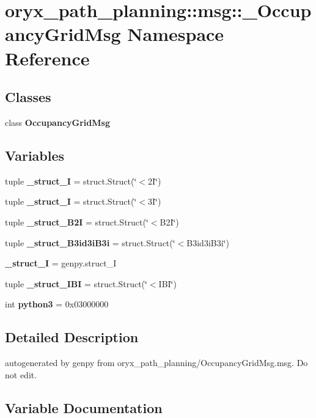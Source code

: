 \section{oryx\-\_\-path\-\_\-planning\-:\-:msg\-:\-:\-\_\-\-Occupancy\-Grid\-Msg \-Namespace \-Reference}
\label{namespaceoryx__path__planning_1_1msg_1_1__OccupancyGridMsg}
\subsection*{\-Classes}
\begin{DoxyCompactItemize}
\item 
class {\bf \-Occupancy\-Grid\-Msg}
\end{DoxyCompactItemize}
\subsection*{\-Variables}
\begin{DoxyCompactItemize}
\item 
tuple {\bf \-\_\-struct\-\_\-I} = struct.\-Struct(\char`\"{}$<$2\-I\char`\"{})
\item 
tuple {\bf \-\_\-struct\-\_\-I} = struct.\-Struct(\char`\"{}$<$3\-I\char`\"{})
\item 
tuple {\bf \-\_\-struct\-\_\-\-B2\-I} = struct.\-Struct(\char`\"{}$<$\-B2\-I\char`\"{})
\item 
tuple {\bf \-\_\-struct\-\_\-\-B3id3i\-B3i} = struct.\-Struct(\char`\"{}$<$\-B3id3i\-B3i\char`\"{})
\item 
{\bf \-\_\-struct\-\_\-\-I} = genpy.\-struct\-\_\-\-I
\item 
tuple {\bf \-\_\-struct\-\_\-\-I\-B\-I} = struct.\-Struct(\char`\"{}$<$\-I\-B\-I\char`\"{})
\item 
int {\bf python3} = 0x03000000
\end{DoxyCompactItemize}


\subsection{\-Detailed \-Description}
\begin{DoxyVerb}autogenerated by genpy from oryx_path_planning/OccupancyGridMsg.msg. Do not edit.\end{DoxyVerb}
 

\subsection{\-Variable \-Documentation}
